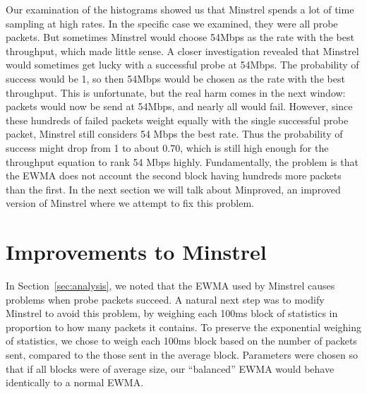 \documentclass[twocolumn,10pt]{article}
\begin{document}
Our examination of the histograms showed us that Minstrel spends a lot
of time sampling at high rates.  In the specific case we examined, they
were all probe packets.  But sometimes Minstrel would choose 54Mbps as
the rate with the best throughput, which made little sense.  A closer
investigation revealed that Minstrel would sometimes get lucky with a
successful probe at 54Mbps.  The probability of success would be 1, so
then 54Mbps would be chosen as the rate with the best throughput.  This
is unfortunate, but the real harm comes in the next window: packets
would now be send at 54Mbps, and nearly all would fail.  However,
since these hundreds of failed packets weight equally with the single
successful probe packet, Minstrel still considers 54 Mbps the best
rate.  Thus the probability of success might drop from 1 to about 0.70,
which is still high enough for the throughput equation to rank 54 Mbps
highly.  Fundamentally, the problem is that the EWMA does not account
the second block having hundreds more packets than the first.  In the
next section we will talk about Minproved, an improved version of
Minstrel where we attempt to fix this problem.


\section{Improvements to Minstrel} \label{sec:minproved}

In Section~\ref{sec:analysis}, we noted that the EWMA used by Minstrel
causes problems when probe packets succeed.  A natural next step was
to modify Minstrel to avoid this problem, by weighing each 100ms block
of statistics in proportion to how many packets it contains.  To
preserve the exponential weighing of statistics, we chose to weigh
each 100ms block based on the number of packets sent, compared to the
those sent in the average block.  Parameters were chosen so that if
all blocks were of average size, our ``balanced'' EWMA would behave
identically to a normal EWMA.
\end{document}
